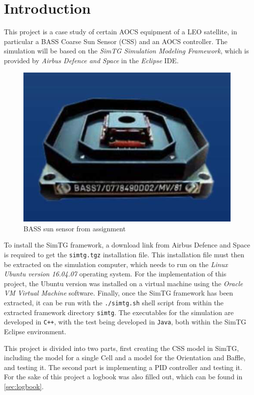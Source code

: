 \section{Introduction}
\label{sec:introduction}

This project is a case study of certain AOCS equipment of a LEO satellite, in particular a BASS Coarse Sun Sensor (CSS) and an AOCS controller.
The simulation will be based on the \textit{SimTG Simulation Modeling Framework}, which is provided by \textit{Airbus Defence and Space} in the \textit{Eclipse} IDE. 

\begin{figure}[h]
    \centering
    \includegraphics[width=0.5\linewidth]{Graphics/BASS.png}
    \caption{BASS sun sensor from assignment}
    \label{fig:bass}
\end{figure}

To install the SimTG framework, a download link from Airbus Defence and Space is required to get the \texttt{simtg.tgz} installation file.
This installation file must then be extracted on the simulation computer, which needs to run on the \textit{Linux Ubuntu version 16.04.07} operating system. 
For the implementation of this project, the Ubuntu version was installed on a virtual machine using the \textit{Oracle VM Virtual Machine} software. 
Finally, once the SimTG framework has been extracted, it can be run with the \texttt{./simtg.sh} shell script from within the extracted framework directory \texttt{simtg}.
The executables for the simulation are developed in \texttt{C++}, with the test being developed in \texttt{Java}, both within the SimTG Eclipse environment.

This project is divided into two parts, first creating the CSS model in SimTG, including the model for a single Cell and a model for the Orientation and Baffle, and testing it. 
The second part is implementing a PID controller and testing it. 
For the sake of this project a logbook was also filled out, which can be found in \autoref{sec:logbook}.











